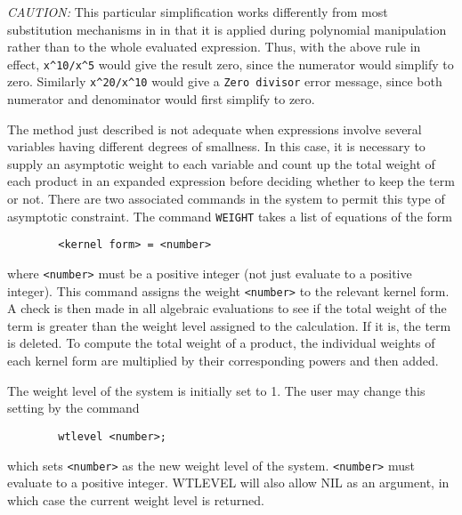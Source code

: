 {\it CAUTION:}  This particular simplification works differently from most
substitution mechanisms in {\REDUCE} in that it is applied during
polynomial manipulation rather than to the whole evaluated expression.
Thus, with the above rule in effect, {\tt x\verb|^|10/x\verb|^|5} would give the
result zero, since the numerator would simplify to zero.  Similarly
{\tt x\verb|^|20/x\verb|^|10} would give a {\tt Zero divisor} error message,
since both numerator and denominator would first simplify to zero.

\hypertarget{command:WEIGHT}{}
The method just described is not adequate when expressions involve several
variables having different degrees of smallness. In this case, it is
necessary to supply an asymptotic weight to each variable and count up the
total weight of each product in an expanded expression before deciding
whether to keep the term or not. There are two associated commands in the
system to permit this type of asymptotic constraint. The command {\tt WEIGHT}
takes a list of equations of the form
\begin{verbatim}
        <kernel form> = <number>
\end{verbatim}
where {\tt <number>} must be a positive integer (not just evaluate to a
positive integer).  This command assigns the weight {\tt <number>} to the
relevant kernel form.  A check is then made in all algebraic evaluations
to see if the total weight of the term is greater than the weight level
assigned to the calculation.  If it is, the term is deleted.  To compute
the total weight of a product, the individual weights of each kernel form
are multiplied by their corresponding powers and then added.

\hypertarget{command:WTLEVEL}{}
The weight level of the system is initially set to 1. The user may change
this setting by the command
\begin{verbatim}
        wtlevel <number>;
\end{verbatim}
which sets {\tt <number>} as the new weight level of the system.
{\tt <number>} must evaluate to a positive integer.  WTLEVEL will also
allow NIL as an argument, in which case the current weight level is returned.
